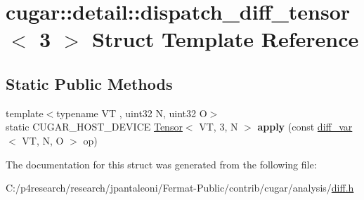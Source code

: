 \hypertarget{structcugar_1_1detail_1_1dispatch__diff__tensor_3_013_01_4}{}\section{cugar\+:\+:detail\+:\+:dispatch\+\_\+diff\+\_\+tensor$<$ 3 $>$ Struct Template Reference}
\label{structcugar_1_1detail_1_1dispatch__diff__tensor_3_013_01_4}
\subsection*{Static Public Methods}
\begin{DoxyCompactItemize}
\item 
\mbox{\label{structcugar_1_1detail_1_1dispatch__diff__tensor_3_013_01_4_a3125368d0b71369c48cb9ef9a2d61641}} 
{\footnotesize template$<$typename VT , uint32 N, uint32 O$>$ }\\static C\+U\+G\+A\+R\+\_\+\+H\+O\+S\+T\+\_\+\+D\+E\+V\+I\+CE \hyperlink{structcugar_1_1_tensor}{Tensor}$<$ VT, 3, N $>$ {\bfseries apply} (const \hyperlink{structcugar_1_1diff__var}{diff\+\_\+var}$<$ VT, N, O $>$ op)
\end{DoxyCompactItemize}


The documentation for this struct was generated from the following file\+:\begin{DoxyCompactItemize}
\item 
C\+:/p4research/research/jpantaleoni/\+Fermat-\/\+Public/contrib/cugar/analysis/\hyperlink{diff_8h}{diff.\+h}\end{DoxyCompactItemize}
